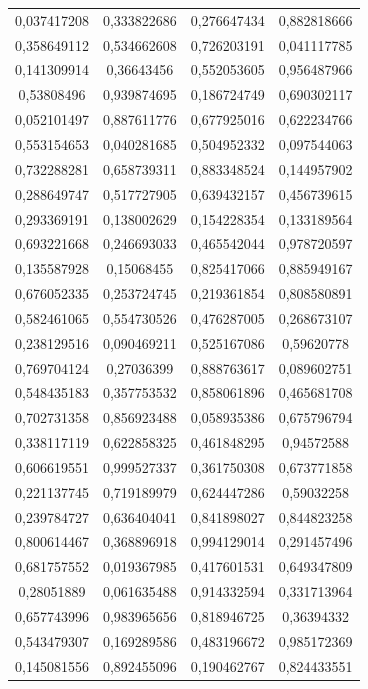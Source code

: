 \documentclass[a4paper,12pt]{article}
\begin{document}
\begin{longtable}{|c|c|c|c|}
0,037417208 & 0,333822686 & 0,276647434 & 0,882818666 \\
0,358649112 & 0,534662608 & 0,726203191 & 0,041117785 \\
0,141309914 & 0,36643456 & 0,552053605 & 0,956487966 \\
0,53808496 & 0,939874695 & 0,186724749 & 0,690302117 \\
0,052101497 & 0,887611776 & 0,677925016 & 0,622234766 \\
0,553154653 & 0,040281685 & 0,504952332 & 0,097544063 \\
0,732288281 & 0,658739311 & 0,883348524 & 0,144957902 \\
0,288649747 & 0,517727905 & 0,639432157 & 0,456739615 \\
0,293369191 & 0,138002629 & 0,154228354 & 0,133189564 \\
0,693221668 & 0,246693033 & 0,465542044 & 0,978720597 \\
0,135587928 & 0,15068455 & 0,825417066 & 0,885949167 \\
0,676052335 & 0,253724745 & 0,219361854 & 0,808580891 \\
0,582461065 & 0,554730526 & 0,476287005 & 0,268673107 \\
0,238129516 & 0,090469211 & 0,525167086 & 0,59620778 \\
0,769704124 & 0,27036399 & 0,888763617 & 0,089602751 \\
0,548435183 & 0,357753532 & 0,858061896 & 0,465681708 \\
0,702731358 & 0,856923488 & 0,058935386 & 0,675796794 \\
0,338117119 & 0,622858325 & 0,461848295 & 0,94572588 \\
0,606619551 & 0,999527337 & 0,361750308 & 0,673771858 \\
0,221137745 & 0,719189979 & 0,624447286 & 0,59032258 \\
0,239784727 & 0,636404041 & 0,841898027 & 0,844823258 \\
0,800614467 & 0,368896918 & 0,994129014 & 0,291457496 \\
0,681757552 & 0,019367985 & 0,417601531 & 0,649347809 \\
0,28051889 & 0,061635488 & 0,914332594 & 0,331713964 \\
0,657743996 & 0,983965656 & 0,818946725 & 0,36394332 \\
0,543479307 & 0,169289586 & 0,483196672 & 0,985172369 \\
0,145081556 & 0,892455096 & 0,190462767 & 0,824433551 \\

\end{longtable}
\end{document}
